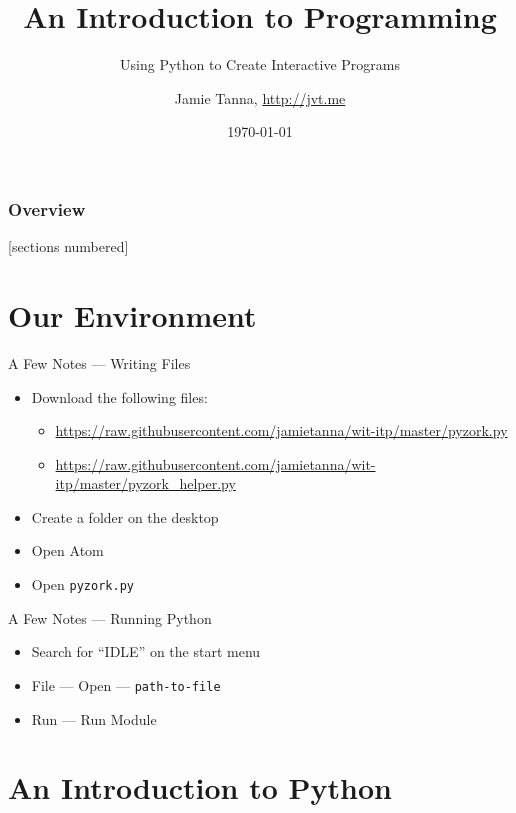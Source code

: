 \documentclass[10pt]{beamer}
\title{An Introduction to Programming}
\subtitle{Using Python to Create Interactive Programs}
\date{\today}
\author{Jamie Tanna, \url{http://jvt.me}}
\institute{\href{http://hacksocnotts.co.uk}{Hacksoc Nottingham}
}
\begin{document}
\maketitle

\begin{frame}
	\frametitle{Overview}
	[sections numbered]
	\tableofcontents
\end{frame}

\section{Our Environment}

\begin{frame}{A Few Notes --- Writing Files}

	\begin{itemize}
		\item Download the following files:
			\begin{itemize}
				\item \url{https://raw.githubusercontent.com/jamietanna/wit-itp/master/pyzork.py}
				\item \url{https://raw.githubusercontent.com/jamietanna/wit-itp/master/pyzork_helper.py}
			\end{itemize}

		\item Create a folder on the desktop
		\item Open Atom
		\item Open \texttt{pyzork.py}
	\end{itemize}

\end{frame}

\begin{frame}{A Few Notes --- Running Python}

	\begin{itemize}
		\item Search for ``IDLE'' on the start menu
		\item File --- Open --- \texttt{path-to-file}
		\item Run --- Run Module
	\end{itemize}

\end{frame}

\section{An Introduction to Python}
\end{document}
